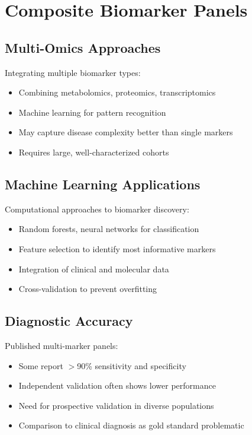 \section{Composite Biomarker Panels}
\label{sec:composite-biomarkers}

\subsection{Multi-Omics Approaches}

Integrating multiple biomarker types:
\begin{itemize}
    \item Combining metabolomics, proteomics, transcriptomics
    \item Machine learning for pattern recognition
    \item May capture disease complexity better than single markers
    \item Requires large, well-characterized cohorts
\end{itemize}

\subsection{Machine Learning Applications}

Computational approaches to biomarker discovery:
\begin{itemize}
    \item Random forests, neural networks for classification
    \item Feature selection to identify most informative markers
    \item Integration of clinical and molecular data
    \item Cross-validation to prevent overfitting
\end{itemize}

\subsection{Diagnostic Accuracy}

Published multi-marker panels:
\begin{itemize}
    \item Some report $>$90\% sensitivity and specificity
    \item Independent validation often shows lower performance
    \item Need for prospective validation in diverse populations
    \item Comparison to clinical diagnosis as gold standard problematic
\end{itemize}

